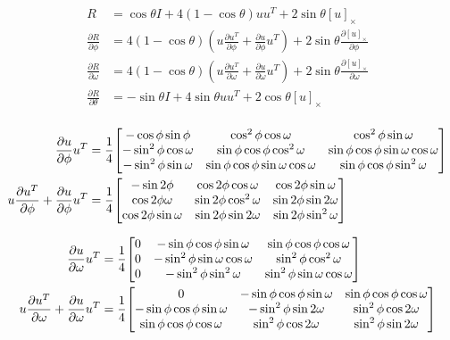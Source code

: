 \documentclass[12pt]{article}
\newcommand*{\Scale}[2][4]{\scalebox{#1}{$#2$}}%
\begin{document}
\begin{align}
  R &= \cos\theta I + 4(1-\cos\theta)uu^T + 2\sin\theta[u]_\times \\
  \frac{\partial R}{\partial\phi} &= 4(1-\cos\theta)(u\frac{\partial u^T}{\partial\phi} + \frac{\partial u}{\partial\phi}u^T) + 2\sin\theta\frac{\partial [u]_\times}{\partial\phi} \\ 
  \frac{\partial R}{\partial\omega} &= 4(1-\cos\theta)(u\frac{\partial u^T}{\partial\omega} + \frac{\partial u}{\partial\omega}u^T) + 2\sin\theta\frac{\partial [u]_\times}{\partial\omega}  \\
  \frac{\partial R}{\partial\theta} &= -\sin\theta I + 4\sin\theta uu^T + 2\cos\theta[u]_\times \\
\end{align}

\begin{align}
\frac{\partial u}{\partial\phi}u^T &= \frac{1}{4}\Scale[1.0]{\begin{bmatrix}
-\cos\phi\sin\phi & \cos^2\phi\cos\omega & \cos^2\phi\sin\omega \\
-\sin^2\phi\cos\omega & \sin\phi\cos\phi\cos^2\omega & \sin\phi\cos\phi\sin\omega\cos\omega \\
-\sin^2\phi\sin\omega & \sin\phi\cos\phi\sin\omega\cos\omega  & \sin\phi\cos\phi\sin^2\omega
\end{bmatrix}} \\
u\frac{\partial u^T}{\partial\phi} + \frac{\partial u}{\partial\phi}u^T &= \frac{1}{4}\Scale[1.0]{\begin{bmatrix}
-\sin 2\phi & \cos 2\phi \cos\omega & \cos 2\phi\sin\omega \\
\cos 2\phi\omega & \sin 2\phi\cos^2\omega & \sin 2\phi\sin 2\omega \\
\cos 2\phi\sin\omega & \sin 2\phi\sin 2\omega & \sin 2\phi\sin^2\omega 
\end{bmatrix}} 
\end{align}

\begin{align}
\frac{\partial u}{\partial\omega}u^T &= \frac{1}{4}\Scale[1.0]{\begin{bmatrix}
0 & -\sin\phi\cos\phi\sin\omega & \sin\phi\cos\phi\cos\omega \\
0 & -\sin^2\phi\sin\omega\cos\omega & \sin^2\phi\cos^2\omega \\
0 & -\sin^2\phi\sin^2\omega & \sin^2\phi\sin\omega\cos\omega
\end{bmatrix}} \\
u\frac{\partial u^T}{\partial\omega} + \frac{\partial u}{\partial\omega}u^T &= \frac{1}{4}\Scale[1.0]{\begin{bmatrix}
0 & -\sin\phi\cos\phi\sin\omega & \sin\phi\cos\phi\cos\omega \\
-\sin\phi\cos\phi\sin\omega & -\sin^2\phi\sin 2\omega & \sin^2\phi\cos 2\omega \\
\sin\phi\cos\phi\cos\omega & \sin^2\phi\cos 2\omega & \sin^2\phi\sin 2\omega
\end{bmatrix}} 
\end{align}
\end{document}
